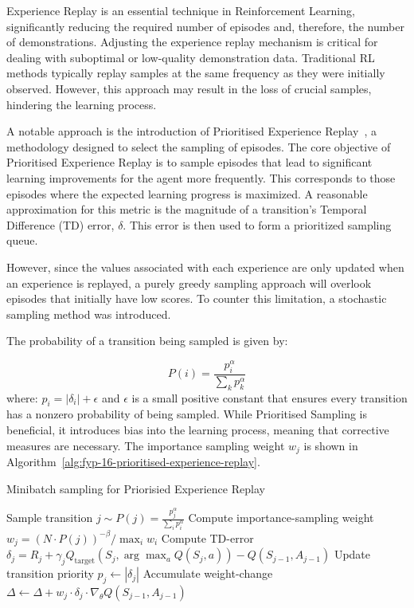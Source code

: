 
Experience Replay is an essential technique in Reinforcement Learning, significantly reducing the required number of episodes and, therefore, the number of demonstrations.
Adjusting the experience replay mechanism is critical for dealing with suboptimal or low-quality demonstration data.
Traditional RL methods typically replay samples at the same frequency as they were initially observed.
However, this approach may result in the loss of crucial samples, hindering the learning process.

A notable approach is the introduction of Prioritised Experience Replay~\cite{fyp-16-prioritised-experience-replay}, a methodology designed to select the sampling of episodes. 
The core objective of Prioritised Experience Replay is to sample episodes that lead to significant learning improvements for the agent more frequently. 
This corresponds to those episodes where the expected learning progress is maximized. 
A reasonable approximation for this metric is the magnitude of a transition's Temporal Difference (TD) error, $\delta$. 
This error is then used to form a prioritized sampling queue.

However, since the values associated with each experience are only updated when an experience is replayed, a purely greedy sampling approach will overlook episodes that initially have low scores.
To counter this limitation, a stochastic sampling method was introduced.

The probability of a transition being sampled is given by:

\[ P(i) = \frac{p_{i}^{\alpha}}{\sum_{k} p_{k}^{\alpha}} \]
where: $p_{i} = |\delta_{i}| + \epsilon$ and $\epsilon$ is a small positive constant that ensures every transition has a nonzero probability of being sampled.
While Prioritised Sampling is beneficial, it introduces bias into the learning process, meaning that corrective measures are necessary. 
The importance sampling weight $w_j$ is shown in Algorithm~\ref{alg:fyp-16-prioritised-experience-replay}.

\begin{algorithm}
  \caption{Minibatch sampling for Priorisied Experience Replay}
  \label{alg:fyp-16-prioritised-experience-replay}
  \begin{algorithmic}[1]
      \State Sample transition $j \sim P(j) = \frac{p^{\alpha}_j}{\sum_i p^{\alpha}_i}$
      \State Compute importance-sampling weight $w_j = \left( N \cdot P(j) \right)^{-\beta} / \max_i w_i$
      \State Compute TD-error $\delta_j = R_j + \gamma_j Q_{\text{target}} \left( S_j, \arg\max_a Q(S_j, a) \right) - Q(S_{j-1}, A_{j-1})$
      \State Update transition priority $p_j \leftarrow |\delta_j|$
      \State Accumulate weight-change $\Delta \leftarrow \Delta + w_j \cdot \delta_j \cdot \nabla_{\theta}Q(S_{j-1}, A_{j-1})$
  \EndFor
  \end{algorithmic}
  \end{algorithm}  
  

